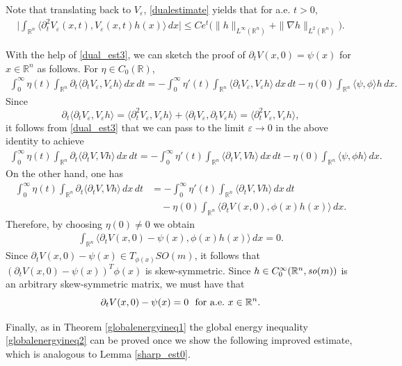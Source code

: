 \documentclass[12pt,twoside,reqno]{amsart}
\theoremstyle{definition}              %
\theoremstyle{remark}                  %
\newcommand{\R}{\mathbb{R}}                 %
\newcommand{\eps}{\varepsilon}
\renewcommand{\1}{\mathbbm{1}}                                      %
\numberwithin{equation}{section}
\numberwithin{definition}{section}
\numberwithin{theorem}{section}
\numberwithin{remark}{section}
\begin{document}
Note that translating back to $V_\eps$, 
\eqref{dualestimate} yields that for a.e. $t>0$,
\begin{align}\label{dual_est3}
 \Big|\int_{\mathbb{R}^n} 
 \langle\partial_t^2V_\eps(x,t), V_\eps(x,t) h(x)\rangle\,dx\Big|\le Ce^t\Big(\|h\|_{L^\infty(\mathbb {R}^n)}+\|\nabla h\|_{L^2(\mathbb{R}^n)}\Big).
\end{align}  

With the help of \eqref{dual_est3}, we can sketch the proof of $\partial_t V(x,0)=\psi(x)$ for $x\in\R^n$ as follows. 
For $\eta\in C_0(\R)$,
\begin{align*}
\int_0^\infty\eta(t)\int_{\R^n}\partial_t\langle \partial_tV_\eps, V_\eps h\rangle\,dx\,dt
=-\int_0^\infty\eta'(t)\int_{\R^n}\langle \partial_tV_\eps, V_\eps h\rangle\,dx\,dt
-\eta(0)\int_{\R^n}\langle\psi,\phi\rangle h\,dx.
\end{align*}
Since 
$$\partial_t\langle \partial_tV_\eps, V_\eps h\rangle
=\langle\partial_t^2 V_\eps, V_\eps h\rangle
+\langle\partial_tV_\eps, \partial_tV_\eps h\rangle
=\langle\partial_t^2 V_\eps, V_\eps h\rangle,
$$
it follows from \eqref{dual_est3} that we can pass to the limit $\eps\to 0$ in the above identity to achieve
\begin{align*}
\int_0^\infty\eta(t)\int_{\R^n}\partial_t\langle \partial_tV, V h\rangle\,dx\,dt
=-\int_0^\infty\eta'(t)\int_{\R^n}\langle \partial_tV, V h\rangle\,dx\,dt
-\eta(0)\int_{\R^n}\langle\psi,\phi h\rangle\,dx.
\end{align*}
On the other hand, one has
\begin{align*}
\int_0^\infty\eta(t)\int_{\R^n}\partial_t\langle \partial_tV, V h\rangle\,dx\,dt
&=-\int_0^\infty\eta'(t)\int_{\R^n}\langle \partial_tV, V h\rangle\,dx\,dt\\
&\quad-\eta(0)\int_{\R^n}\langle\partial_tV(x,0),\phi(x)h(x)\rangle\,dx.
\end{align*}
Therefore, by choosing $\eta(0)\not=0$ we obtain 
\begin{align*}
\int_{\R^n}\langle\partial_tV(x,0)-\psi(x),\phi(x)h(x)\rangle\,dx
=0.
\end{align*}
Since $\partial_t V(x,0)-\psi(x)\in T_{\phi(x)}{SO(m)}$, it follows
that $(\partial_t V(x,0)-\psi(x))^T\phi(x)$ is skew-symmetric. 
Since $h\in C_0^\infty(\R^n, {\it so}(m))$ is an arbitrary skew-symmetric matrix, we must have that 
\[
\partial_t V(x,0)-\psi(x) =0
\ \ {\rm{ for\ a.e.}}\ x\in\R^n.
\]

\medskip
Finally, as in Theorem \ref{globalenergyineq1} the global energy inequality \eqref{globalenergyineq2} can be proved 
once we show the following improved estimate, which is analogous to Lemma \ref{sharp_est0}. 
\end{document}
